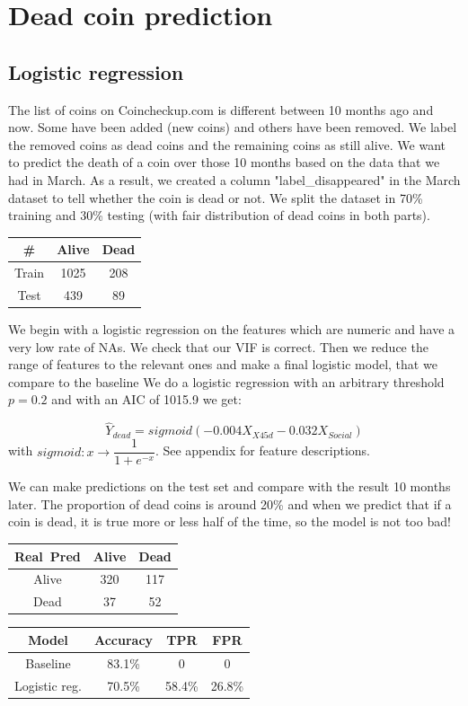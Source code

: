 \documentclass[11pt, english, letterpaper]{article}
\begin{document}
\section{Dead coin prediction}

\subsection{Logistic regression}

The list of coins on Coincheckup.com is different between 10 months ago and now. Some have been added (new coins) and others have been removed. We label the removed coins as dead coins and the remaining coins as still alive. We want to predict the death of a coin over those 10 months based on the data that we had in March. As a result, we created a column "label\_disappeared" in the March dataset to tell whether the coin is dead or not. We split the dataset in 70\% training and 30\% testing (with fair distribution of dead coins in both parts).

\begin{table}[!h]
    \begin{center}
        \begin{tabular}{c|cc}
        \#    & Alive & Dead \\
              \hline
        Train & 1025  & 208  \\
        Test  & 439   & 89  
        \end{tabular}
    \end{center}
\end{table}

We begin with a logistic regression on the features which are numeric and have a very low rate of NAs. We check that our VIF is correct. Then we reduce the range of features to the relevant ones and make a final logistic model, that we compare to the baseline
We do a logistic regression with an arbitrary threshold $p=0.2$ and with an AIC of 1015.9 we get:

$$\hat{Y}_{dead} = sigmoid(-0.004 X_{X45d} - 0.032 X_{Social})$$
with $sigmoid: x \rightarrow \dfrac{1}{1+e^{-x}}$.
See appendix for feature descriptions.

We can make predictions on the test set and compare with the result 10 months later. The proportion of dead coins is around 20\% and when we predict that if a coin is dead, it is true more or less half of the time, so the model is not too bad!

\begin{center}
    \begin{tabular}{c|cc}
    Real\ Pred    & Alive & Dead \\
          \hline
    Alive & 320  & 117  \\
    Dead  & 37   & 52  
    \end{tabular} \quad \quad
    \begin{tabular}{c|ccc}
    Model & Accuracy & TPR & FPR \\
          \hline
    Baseline  & 83.1\%   & 0 & 0\\
    Logistic reg. & 70.5\%  & 58.4\% & 26.8\%  
    \end{tabular}
\end{center}
\end{document}
